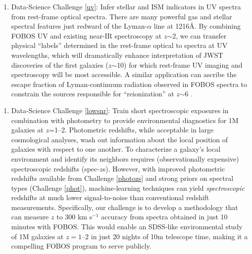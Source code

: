 \documentclass[oneside,11pt]{amsart}
\newcounter{chalno}
\newcommand{\chal}[1]{\refstepcounter{chalno}\label{#1}}
\begin{document}
\begin{enumerate}[rightmargin=0.2cm,leftmargin=0.2cm]
%
\chal{uv}
%
\item[] {\textsf {\large Data-Science Challenge \ref{uv}: Infer stellar
and ISM indicators in UV spectra from rest-frame optical spectra}}.
There are many powerful gas and stellar spectral features just redward
of the Lyman-$\alpha$ line at 1216\AA.  By combining FOBOS UV and
existing near-IR spectroscopy at $z$$\sim$2, we can transfer physical
``labels'' determined in the rest-frame optical to spectra at UV
wavelengths, which will dramatically enhance interpretation of JWST
discoveries of the first galaxies ($z$$\sim$10) for which rest-frame UV
imaging and spectroscopy will be most accessible.  A similar application
can ascribe the escape fraction of Lyman-continuum radiation observed in
FOBOS spectra to constrain the sources responsible for ``reionization''
at $z$$\sim$6 \citep[cf.]{2018ApJ...869..123S}.


\end{enumerate}

\begin{enumerate}[rightmargin=0.2cm,leftmargin=0.2cm]
%
\chal{lowsnr}
%
\item[] {\textsf {\large Data-Science Challenge \ref{lowsnr}: Train
short spectroscopic exposures in combination with photometry to provide
environmental diagnostics for 1M galaxies at $z$=1--2}}.  Photometric
redshifts, while acceptable in large cosmological analyses, wash out
information about the local position of galaxies with respect to one
another.  To characterize a galaxy's local environment and identify its
neighbors requires (observationally expensive) spectroscopic redshifts
(spec-$z$s).  However, with improved photometric redshifts available
from Challenge \ref{photozs} and strong priors on spectral types
(Challenge \ref{phot}), machine-learning techniques can yield
\emph{spectroscopic} redshifts at much lower signal-to-noise than
conventional redshift measurements. Specifically, our challenge is to
develop a methodology that can measure $z$ to 300 km s$^{-1}$ accuracy
from spectra obtained in just 10 minutes with FOBOS.  This would enable
an SDSS-like environmental study of 1M galaxies at $z=1$--$2$ in just 20
nights of 10m telescope time, making it a compelling FOBOS program to
serve publicly.

\end{enumerate}
\end{document}
